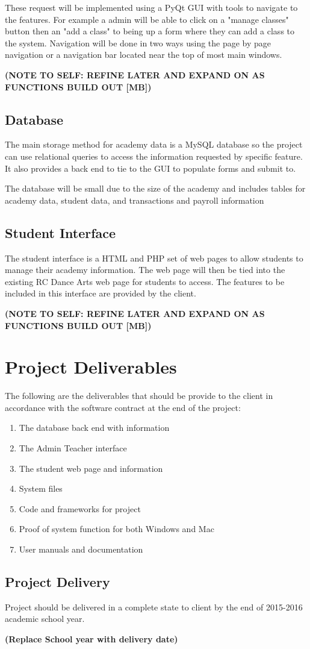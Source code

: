 These request will be implemented using a PyQt GUI with tools to navigate to the features. For example a admin will be able to click on a "manage classes" button then an "add a class" to being up a form where they can add a class to the system. Navigation will be done in two ways using the page by page navigation or a navigation bar located near the top of most main windows.

\bf(NOTE TO SELF: REFINE LATER AND EXPAND ON AS FUNCTIONS BUILD OUT [MB])

\subsection{Database}
The main storage method for academy data is a MySQL database so the project can use relational queries to access the information requested by specific feature. It also provides a back end to tie to the GUI to populate forms and submit to.

The database will be small due to the size of the academy and includes tables for academy data, student data, and transactions and payroll information

\subsection{Student Interface}
The student interface is a HTML and PHP set of web pages to allow students to manage their academy information. The web page will then be tied into the existing RC Dance Arts web page for students to access. The features to be included in this interface are provided by the client.

\bf(NOTE TO SELF: REFINE LATER AND EXPAND ON AS FUNCTIONS BUILD OUT [MB])

\section{Project Deliverables}
The following are the deliverables that should be provide to the client in accordance with the software contract at the end of the project:

\begin{enumerate}
\item The database back end with information
\item The Admin Teacher interface
\item The student web page and information
\item System files
\item Code and frameworks for project
\item Proof of system function for both Windows and Mac
\item User manuals and documentation
\end{enumerate}

\subsection{Project Delivery}
Project should be delivered in a complete state to client by the end of 2015-2016 academic school year.

\bf(Replace School year with delivery date) 

